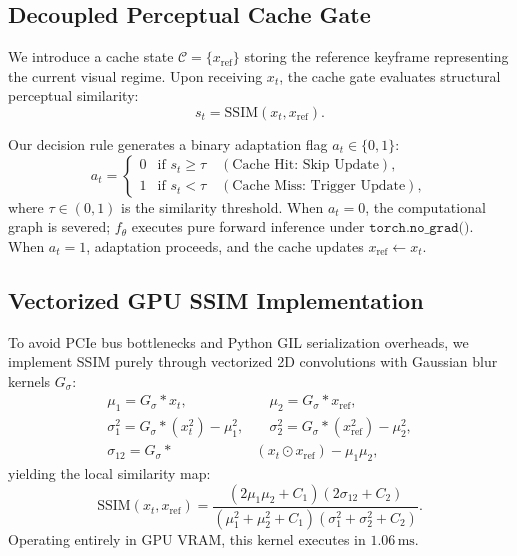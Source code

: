 \documentclass[10pt,twocolumn,letterpaper]{article}
\begin{document}
\subsection{Decoupled Perceptual Cache Gate}
We introduce a cache state $\mathcal{C} = \{x_{\text{ref}}\}$ storing the reference keyframe representing the current visual regime. Upon receiving $x_t$, the cache gate evaluates structural perceptual similarity:
\begin{equation}
    s_t = \text{SSIM}(x_t, x_{\text{ref}}).
\end{equation}

Our decision rule generates a binary adaptation flag $a_t \in \{0, 1\}$:
\begin{equation}
    a_t = \begin{cases} 
        0 & \text{if } s_t \ge \tau \quad (\text{Cache Hit: Skip Update}), \\
        1 & \text{if } s_t < \tau \quad (\text{Cache Miss: Trigger Update}),
    \end{cases}
\end{equation}
where $\tau \in (0, 1)$ is the similarity threshold. When $a_t = 0$, the computational graph is severed; $f_\theta$ executes pure forward inference under $\texttt{torch.no\_grad()}$. When $a_t = 1$, adaptation proceeds, and the cache updates $x_{\text{ref}} \leftarrow x_t$.

\subsection{Vectorized GPU SSIM Implementation}
To avoid PCIe bus bottlenecks and Python GIL serialization overheads, we implement SSIM purely through vectorized 2D convolutions with Gaussian blur kernels $G_\sigma$:
\begin{align}
    \mu_1 = G_\sigma * x_t, &\quad \mu_2 = G_\sigma * x_{\text{ref}}, \\
    \sigma_1^2 = G_\sigma * (x_t^2) - \mu_1^2, &\quad \sigma_2^2 = G_\sigma * (x_{\text{ref}}^2) - \mu_2^2, \\
    \sigma_{12} = G_\sigma * &(x_t \odot x_{\text{ref}}) - \mu_1 \mu_2,
\end{align}
yielding the local similarity map:
\begin{equation}
    \text{SSIM}(x_t, x_{\text{ref}}) = \frac{(2\mu_1\mu_2 + C_1)(2\sigma_{12} + C_2)}{(\mu_1^2 + \mu_2^2 + C_1)(\sigma_1^2 + \sigma_2^2 + C_2)}.
\end{equation}
Operating entirely in GPU VRAM, this kernel executes in $1.06\,\text{ms}$.
\end{document}
